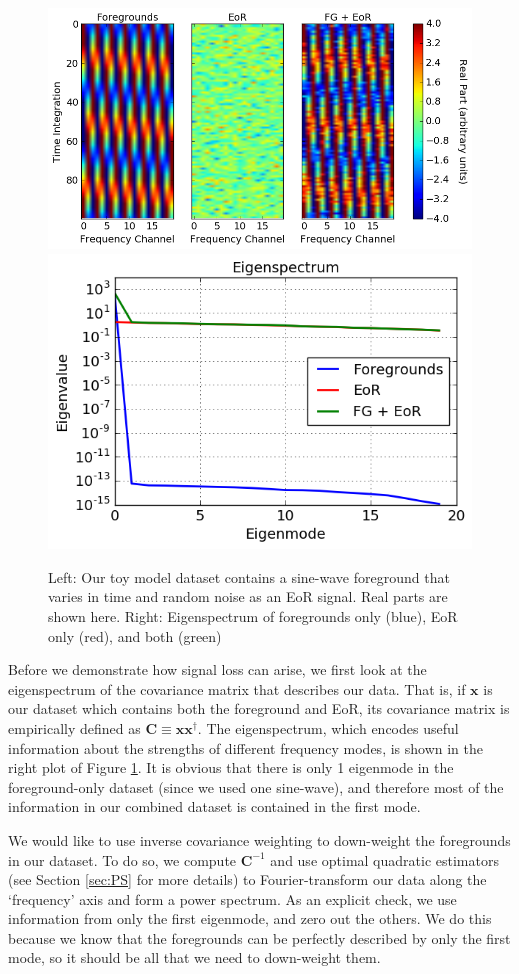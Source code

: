 \documentclass[preprint2,numberedappendix,tighten,twocolappendix]{aastex6}  %
\begin{document}
\begin{figure}
	\centering
	\includegraphics[height=0.3\textwidth]{plots/toy_sigloss1.png}
	\includegraphics[height=0.3\textwidth]{plots/toy_sigloss2.png}
	\caption{Left: Our toy model dataset contains a sine-wave foreground that varies in time and random noise as an EoR signal. Real parts are shown here. Right: Eigenspectrum of foregrounds only (blue), EoR only (red), and both (green)}
	\label{fig:toy_sigloss1}
\end{figure}

Before we demonstrate how signal loss can arise, we first look at the eigenspectrum of the covariance matrix that describes our data. That is, if $\textbf{x}$ is our dataset which contains both the foreground and EoR, its covariance matrix is empirically defined as $\textbf{C} \equiv \textbf{xx}^{\dagger}$. The eigenspectrum, which encodes useful information about the strengths of different frequency modes, is shown in the right plot of Figure \ref{fig:toy_sigloss1}. It is obvious that there is only 1 eigenmode in the foreground-only dataset (since we used one sine-wave), and therefore most of the information in our combined dataset is contained in the first mode. 

We would like to use inverse covariance weighting to down-weight the foregrounds in our dataset. To do so, we compute $\textbf{C}^{-1}$ and use optimal quadratic estimators (see Section \ref{sec:PS} for more details) to Fourier-transform our data along the `frequency' axis and form a power spectrum. As an explicit check, we use information from only the first eigenmode, and zero out the others. We do this because we know that the foregrounds can be perfectly described by only the first mode, so it should be all that we need to down-weight them.
\end{document}
